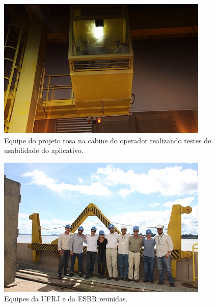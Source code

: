 \begin{figure}[h!]
  \centering
  \includegraphics[width=1\linewidth]{Fotos/Janeiro2015/20.JPG}
  \caption{Equipe do projeto rosa na cabine do operador realizando testes de
  usabilidade do aplicativo.}
  \label{nov20134}
\end{figure}

\begin{figure}[h!]
  \centering
  \includegraphics[width=1\linewidth]{Fotos/Janeiro2015/23.JPG}
  \caption{Equipes da UFRJ e da ESBR reunidas.}
  \label{nov20134}
\end{figure}

